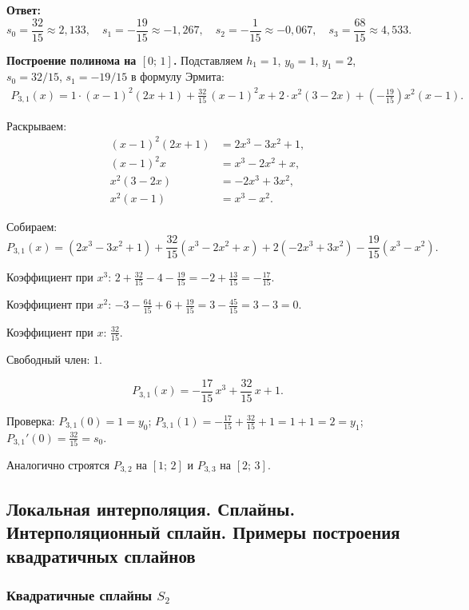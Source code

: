 \textbf{Ответ:}
\[
    \boxed{s_0 = \frac{32}{15} \approx 2{,}133, \quad s_1 = -\frac{19}{15} \approx -1{,}267, \quad s_2 = -\frac{1}{15} \approx -0{,}067, \quad s_3 = \frac{68}{15} \approx 4{,}533.}
\]

\textbf{Построение полинома на $[0;\,1]$.} Подставляем $h_1 = 1$, $y_0 = 1$, $y_1 = 2$, $s_0 = 32/15$, $s_1 = -19/15$ в формулу Эрмита:
\begin{multline*}
    P_{3,1}(x) = 1 \cdot (x-1)^2(2x+1) + \frac{32}{15}\,(x-1)^2 x + 2 \cdot x^2(3-2x) + \left(-\frac{19}{15}\right) x^2(x-1).
\end{multline*}

Раскрываем:
\begin{align*}
    (x-1)^2(2x+1) &= 2x^3 - 3x^2 + 1, \\
    (x-1)^2 x &= x^3 - 2x^2 + x, \\
    x^2(3-2x) &= -2x^3 + 3x^2, \\
    x^2(x-1) &= x^3 - x^2.
\end{align*}

Собираем:
\[
    P_{3,1}(x) = (2x^3 - 3x^2 + 1) + \frac{32}{15}(x^3 - 2x^2 + x) + 2(-2x^3 + 3x^2) - \frac{19}{15}(x^3 - x^2).
\]

Коэффициент при $x^3$: $2 + \frac{32}{15} - 4 - \frac{19}{15} = -2 + \frac{13}{15} = -\frac{17}{15}$.

Коэффициент при $x^2$: $-3 - \frac{64}{15} + 6 + \frac{19}{15} = 3 - \frac{45}{15} = 3 - 3 = 0$.

Коэффициент при $x$: $\frac{32}{15}$.

Свободный член: $1$.

\[
    \boxed{P_{3,1}(x) = -\frac{17}{15}\,x^3 + \frac{32}{15}\,x + 1.}
\]

Проверка: $P_{3,1}(0) = 1 = y_0$\;\checkmark; $P_{3,1}(1) = -\frac{17}{15} + \frac{32}{15} + 1 = 1 + 1 = 2 = y_1$\;\checkmark; $P_{3,1}'(0) = \frac{32}{15} = s_0$\;\checkmark.

Аналогично строятся $P_{3,2}$ на $[1;\,2]$ и $P_{3,3}$ на $[2;\,3]$.


\newpage
\subsection{Локальная интерполяция. Сплайны. Интерполяционный сплайн. Примеры построения квадратичных сплайнов}

\subsubsection*{Квадратичные сплайны $S_2$}

